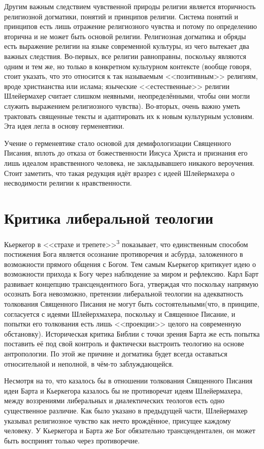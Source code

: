 \documentclass[11pt]{article}
\begin{document}
Другим важным следствием чувственной природы религии является вторичность религиозной догматики, понятий и принципов религии.
Система понятий и принципов есть лишь отражение религиозного чувства и потому по определению вторична и не может быть основой
религии. Религиозная догматика и обряды есть выражение религии на языке современной культуры, из чего вытекает два важных
следствия. Во-первых, все религии равноправны, поскольку являются одним и тем же, но только в конкретном культурном контексте
(вообще говоря, стоит указать, что это относится к так называемым {}<<позитивным>>{} религиям, вроде христианства или ислама;
языческие {}<<естественные>>{} религии Шлейермахер считает слишком неявными, неопределёнными, чтобы они могли служить выражением
религиозного чувства). Во-вторых, очень важно уметь трактовать священные тексты и адаптировать их к новым культурным условиям.
Эта идея легла в основу герменевтики.

Учение о герменевтике стало основой для демифологизации Священного Писания, вплоть до отказа от божественности Иисуса Христа
и признания его лишь идеалом нравственного человека, не закладывавшего никакого вероучения.
Стоит заметить, что такая редукция идёт вразрез с идеей Шлейермахера о несводимости религии к нравственности.
\section{Критика либеральной теологии}
\label{sec:org20c217b}
Кьеркегор в {}<<страхе и трепете>>{}\textsuperscript{3} показывает, что единственным способом постижения Бога является
осознание противоречия и асбурда, заложенного в возможности прямого общения с Богом. Тем самым
Кьеркегор критикует идею о возможности прихода к Богу через наблюдение за миром и рефлексию.
Карл Барт развивает концепцию трансцендентного Бога, утверждая что поскольку напрямую осознать
Бога невозможно, претензии либеральной теологии на адекватность толкования Священного Писания
не могут быть состоятельными(что, в принципе, согласуется с идеями Шлейерхмахера, поскольку
и Священное Писание, и попытки его толкования есть лишь {}<<проекции>>{} целого на современную
обстановку). Историческая критика Библии с точки зрения Барта же есть попытка поставить её
под свой контроль и фактически выстроить теологию на основе антропологии. По этой же причине
и догматика будет всегда оставаться относительной и неполной, в чём-то заблуждающейся.

Несмотря на то, что казалось бы в отношении толкования Священного Писания идеи Барта и Кьеркегора
казалось бы не противоречат идеям Шлейермахера, между воззрениями либеральных и диалектических
теологов есть одно существенное различие. Как было указано в предыдущей части, Шлейермахер
указывал религиозное чувство как нечто врождённое, присущее каждому человеку. У Кьеркегора и
Барта же Бог обязательно трансцендентален, он может быть воспринят только через противоречие.
\end{document}
